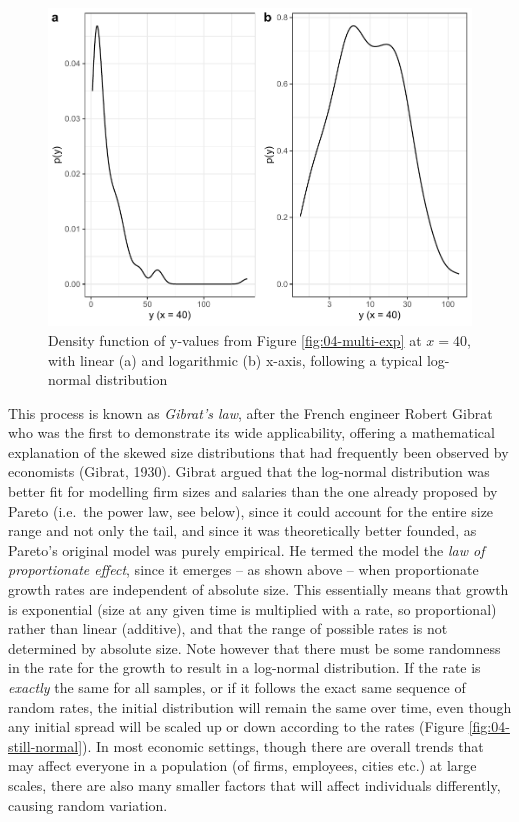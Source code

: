 \documentclass[
  12pt,
]{book}
\begin{document}
\begin{figure}

{\centering \includegraphics[width=0.9\linewidth]{bookdown-demo_files/figure-latex/04-lnorm-exp-1} 

}

\caption{Density function of y-values from Figure \ref{fig:04-multi-exp} at \(x = 40\), with linear (a) and logarithmic (b) x-axis, following a typical log-normal distribution}\label{fig:04-lnorm-exp}
\end{figure}

This process is known as \emph{Gibrat's law}, after the French engineer Robert Gibrat who was the first to demonstrate its wide applicability, offering a mathematical explanation of the skewed size distributions that had frequently been observed by economists (Gibrat, 1930). Gibrat argued that the log-normal distribution was better fit for modelling firm sizes and salaries than the one already proposed by Pareto (i.e.~the power law, see below), since it could account for the entire size range and not only the tail, and since it was theoretically better founded, as Pareto's original model was purely empirical. He termed the model the \emph{law of proportionate effect}, since it emerges -- as shown above -- when proportionate growth rates are independent of absolute size. This essentially means that growth is exponential (size at any given time is multiplied with a rate, so proportional) rather than linear (additive), and that the range of possible rates is not determined by absolute size. Note however that there must be some randomness in the rate for the growth to result in a log-normal distribution. If the rate is \emph{exactly} the same for all samples, or if it follows the exact same sequence of random rates, the initial distribution will remain the same over time, even though any initial spread will be scaled up or down according to the rates (Figure \ref{fig:04-still-normal}). In most economic settings, though there are overall trends that may affect everyone in a population (of firms, employees, cities etc.) at large scales, there are also many smaller factors that will affect individuals differently, causing random variation.
\end{document}
